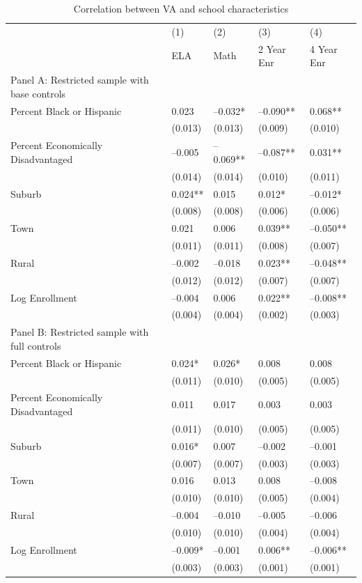 \documentclass{article}
\begin{document}
\begin{table}[tbp] \centering
{}

\caption{Correlation between VA and school characteristics}
{\footnotesize
\begin{tabularx}{\linewidth}{lCCCC}

\toprule
&{(1)}&{(2)}&{(3)}&{(4)} \tabularnewline
{} & ELA & Math & 2 Year Enr & 4 Year Enr \tabularnewline
\midrule \addlinespace[\belowrulesep]
Panel A: Restricted sample with base controls&&&& \tabularnewline
\midrule Percent Black or Hispanic&0.023&--0.032*&--0.090**&0.068** \tabularnewline
&(0.013)&(0.013)&(0.009)&(0.010) \tabularnewline
\midrule Percent Economically Disadvantaged&--0.005&--0.069**&--0.087**&0.031** \tabularnewline
&(0.014)&(0.014)&(0.010)&(0.011) \tabularnewline
\midrule Suburb&0.024**&0.015&0.012*&--0.012* \tabularnewline
&(0.008)&(0.008)&(0.006)&(0.006) \tabularnewline
Town&0.021&0.006&0.039**&--0.050** \tabularnewline
&(0.011)&(0.011)&(0.008)&(0.007) \tabularnewline
Rural&--0.002&--0.018&0.023**&--0.048** \tabularnewline
&(0.012)&(0.012)&(0.007)&(0.007) \tabularnewline
\midrule Log Enrollment&--0.004&0.006&0.022**&--0.008** \tabularnewline
&(0.004)&(0.004)&(0.002)&(0.003) \tabularnewline
\midrule \midrule Panel B: Restricted sample with full controls&&&& \tabularnewline
\midrule Percent Black or Hispanic&0.024*&0.026*&0.008&0.008 \tabularnewline
&(0.011)&(0.010)&(0.005)&(0.005) \tabularnewline
\midrule Percent Economically Disadvantaged&0.011&0.017&0.003&0.003 \tabularnewline
&(0.011)&(0.010)&(0.005)&(0.005) \tabularnewline
\midrule Suburb&0.016*&0.007&--0.002&--0.001 \tabularnewline
&(0.007)&(0.007)&(0.003)&(0.003) \tabularnewline
Town&0.016&0.013&0.008&--0.008 \tabularnewline
&(0.010)&(0.010)&(0.005)&(0.004) \tabularnewline
Rural&--0.004&--0.010&--0.005&--0.006 \tabularnewline
&(0.010)&(0.010)&(0.004)&(0.004) \tabularnewline
\midrule Log Enrollment&--0.009*&--0.001&0.006**&--0.006** \tabularnewline
&(0.003)&(0.003)&(0.001)&(0.001) \tabularnewline
\bottomrule 

\end{tabularx}
}
\end{table}
\end{document}
